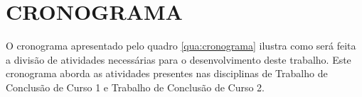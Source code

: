 
 

{\let\clearpage\relax \chapter{CRONOGRAMA}}
\label{chap:cronograma}

O cronograma apresentado pelo quadro \ref{qua:cronograma} ilustra como será feita a divisão de atividades necessárias para o desenvolvimento deste trabalho. Este cronograma aborda as atividades
presentes nas disciplinas de Trabalho de Conclusão de Curso 1 e Trabalho de Conclusão de Curso 2.



